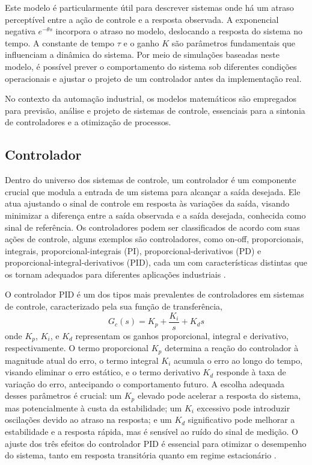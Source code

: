 Este modelo é particularmente útil para descrever sistemas onde há um atraso perceptível entre a ação de controle e a
resposta observada.
A exponencial negativa \( e^{-\theta s} \) incorpora o atraso no modelo, deslocando a resposta do sistema no tempo.
A constante de tempo \( \tau \) e o ganho \( K \) são parâmetros fundamentais que influenciam a dinâmica do sistema.
Por meio de simulações baseadas neste modelo, é possível prever o comportamento do sistema sob diferentes
condições operacionais e ajustar o projeto de um controlador antes da implementação real.

No contexto da automação industrial, os modelos matemáticos são empregados para previsão, análise e projeto de sistemas
de controle, essenciais para a sintonia de controladores e a otimização de processos.

\subsection{Controlador}

Dentro do universo dos sistemas de controle, um controlador é um componente crucial que modula a entrada de um sistema
para alcançar a saída desejada.
Ele atua ajustando o sinal de controle em resposta às variações da saída, visando minimizar a diferença entre a saída
observada e a saída desejada, conhecida como sinal de referência.
Os controladores podem ser classificados de acordo com suas ações de controle, alguns exemplos são controladores,
como on-off, proporcionais, integrais, proporcional-integrais (PI), proporcional-derivativos (PD) e
proporcional-integral-derivativos (PID), cada um com características distintas que os tornam adequados para diferentes
aplicações industriais \cite{ogata2010engenharia}.

O controlador PID é um dos tipos mais prevalentes de controladores em sistemas de controle, caracterizado pela sua
função de transferência,
\begin{equation}
    \label{eq:ctrlr}
    G_c(s) = K_p + \frac{K_i}{s} + K_d s
\end{equation}
onde \( K_p \), \( K_i \), e \( K_d \) representam os ganhos proporcional, integral e derivativo, respectivamente.
O termo proporcional \( K_p \) determina a reação do controlador à magnitude atual do erro,
o termo integral \( K_i \) acumula o erro ao longo do tempo, visando eliminar o erro estático,
e o termo derivativo \( K_d \) responde à taxa de variação do erro, antecipando o comportamento futuro.
A escolha adequada desses parâmetros é crucial: um \( K_p \) elevado pode acelerar a resposta do sistema, mas
potencialmente à custa da estabilidade;
um \( K_i \) excessivo pode introduzir oscilações devido ao atraso na resposta;
e um \( K_d \) significativo pode melhorar a estabilidade e a resposta rápida, mas é sensível ao ruído do sinal de
medição.
O ajuste dos três efeitos do controlador PID é essencial para otimizar o desempenho do sistema, tanto em resposta
transitória quanto em regime estacionário \cite{ogata2010engenharia}.

